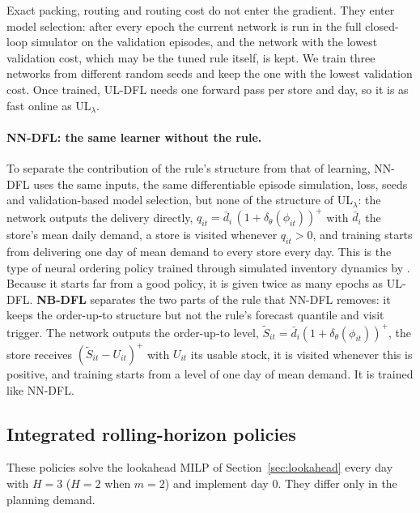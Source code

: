 Exact packing, routing and routing cost do not enter the gradient. They enter model selection: after every epoch the current network is run in the full closed-loop simulator on the validation episodes, and the network with the lowest validation cost, which may be the tuned rule itself, is kept. We train three networks from different random seeds and keep the one with the lowest validation cost. Once trained, UL-DFL needs one forward pass per store and day, so it is as fast online as UL$_\lambda$.

\paragraph{NN-DFL: the same learner without the rule.} To separate the contribution of the rule's structure from that of learning, NN-DFL uses the same inputs, the same differentiable episode simulation, loss, seeds and validation-based model selection, but none of the structure of UL$_\lambda$: the network outputs the delivery directly, $q_{it}=\bar d_i\,(1+\delta_\theta(\phi_{it}))^{+}$ with $\bar d_i$ the store's mean daily demand, a store is visited whenever $q_{it}>0$, and training starts from delivering one day of mean demand to every store every day. This is the type of neural ordering policy trained through simulated inventory dynamics by \citet{alvo2023neural}. Because it starts far from a good policy, it is given twice as many epochs as UL-DFL. \textbf{NB-DFL} separates the two parts of the rule that NN-DFL removes: it keeps the order-up-to structure but not the rule's forecast quantile and visit trigger. The network outputs the order-up-to level, $\tilde S_{it}=\bar d_i(1+\delta_\theta(\phi_{it}))^+$, the store receives $(\tilde S_{it}-U_{it})^+$ with $U_{it}$ its usable stock, it is visited whenever this is positive, and training starts from a level of one day of mean demand. It is trained like NN-DFL.

\subsection{Integrated rolling-horizon policies}\label{sec:la}

These policies solve the lookahead MILP of Section~\ref{sec:lookahead} every day with $H=3$ ($H=2$ when $m=2$) and implement day 0. They differ only in the planning demand.


